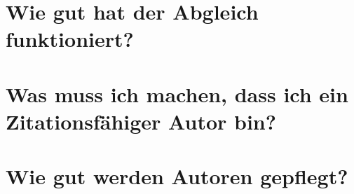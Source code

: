
\section{Wie gut hat der Abgleich funktioniert?}
\label{sec:abgleich_diskussion}

\section{Was muss ich machen, dass ich ein Zitationsfähiger Autor bin?}
\label{sec:zitationsfaehiger_autor_diskussion}

\section{Wie gut werden Autoren gepflegt?}
\label{sec:autoren_pflege_diskussion}
